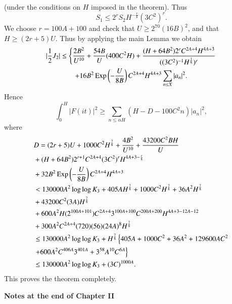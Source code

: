 (under the conditions on $H$ imposed in the theorem). Thus
$$
S_1 \leq 2^r S_2 H^{-\frac{r}{8}} (3C^2)^r.
$$
We choose $r = 100 A + 100$ and check that $U \geq 2^{70} (16B)^2$, and that $H \geq (2r + 5) U$. Thus by applying the main Lemma we obtain
\begin{gather*}
|\frac{1}{2} J_2| \leq \left\{\frac{2B^2}{U^{10}} + \frac{54B}{U} (400 C^2 H) + \frac{(H + 64 B^2) 2^r C^{2A  + 4} H^{4A+3}}{((3C^2)^{-1} H^{\frac{1}{8}})^r} \right.\\
+ 16 B^2 \operatorname{Exp} \left(-\frac{U}{8B}\right) C^{2A+4} H^{4A+3} \sum\limits_{n \leq X} |a_n|^2.
\end{gather*}
Hence
$$
\int^H_0 |F(it)|^2 \geq \sum\limits_{n\leq \alpha H} (H - D - 100C^2 n) |a_n|^2,
$$
where 
\begin{align*}
& D = (2r+5) U + 1000 C^2 H^{\frac{7}{8}} + \frac{4B^2}{U^{10}} + \frac{43200C^2 BH}{U}\\
& + (H + 64 B^2) 2^{r+1} C^{2A+4} (3C^2)^r H^{4 A +3-\frac{r}{8}}\\
& + 32 B^2 \operatorname{Exp} \left(-\frac{U}{8B} \right)  C^{2A+4} H^{4A+3}\\
& < 130000 A^2 \log \log K_3 + 405 A H^{\frac{7}{8}} + 1000C^2 H^{\frac{7}{8}} + 36 A^2 H^{\frac{7}{8}}\\
& + 43200 C^2 (3A) H^{\frac{7}{8}}\\
& + 600 A^2 H (2^{100 A  + 101}) C^{2A+4} 3^{100A+100} C^{200A+200} H^{4A + 3 - 12A-12}\\
& + 300 A^2C^{2A+4} (720) (56) (24A)^8 H^{\frac{7}{8}}\\
& \leq 130000 A^2 \log \log K_3 + H^{\frac{7}{8}} \left\{405A + 1000 C^2 +36 A^2+129600 AC^2 \right.\\
& \left. + 600 A^2 C^{406 A} 3^{401 A} + 3^{58} A^{10} C^{6A} \right\}\\
& \leq 130000 A^2 \log \log K_3 + (3C)^{1000A}.
\end{align*}\pageoriginale
This proves the theorem completely.

\medskip
\begin{center}
\textbf{Notes at the end of Chapter II}
\end{center}

